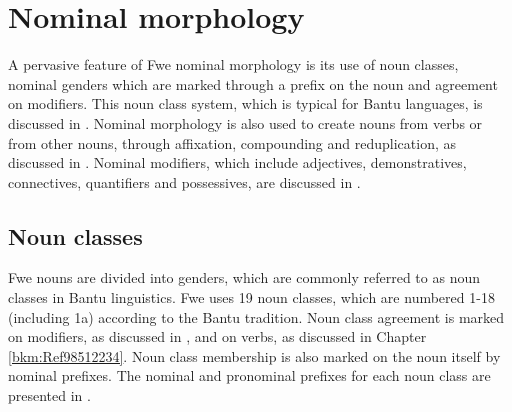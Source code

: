 \chapter{Nominal morphology}
\hypertarget{Toc75352634}{}
A pervasive feature of Fwe nominal morphology is its use of noun classes, nominal genders which are marked through a prefix on the noun and agreement on modifiers. This noun class system, which is typical for Bantu languages, is discussed in . Nominal morphology is also used to create nouns from verbs or from other nouns, through affixation, compounding and reduplication, as discussed in . Nominal modifiers, which include adjectives, demonstratives, connectives, quantifiers and possessives, are discussed in .

\section{Noun classes}
\label{bkm:Ref70948951}\hypertarget{Toc75352635}{}
Fwe nouns are divided into genders, which are commonly referred to as noun classes in Bantu linguistics. Fwe uses 19 noun classes, which are numbered 1-18 (including 1a) according to the Bantu tradition. Noun class agreement is marked on modifiers, as discussed in , and on verbs, as discussed in Chapter \ref{bkm:Ref98512234}. Noun class membership is also marked on the noun itself by nominal prefixes. The nominal and pronominal prefixes for each noun class are presented in .

